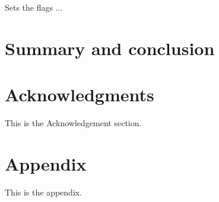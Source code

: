 \documentclass[useAMS,usenatbib,usegraphicx]{mn2e}
\begin{document}
Sets the flags ...


\section{Summary and conclusion}
\label{sec:conclusion}


\section*{Acknowledgments}
This is the Acknowledgement section.



%


\appendix

\section{Appendix}
This is the appendix.
\end{document}
